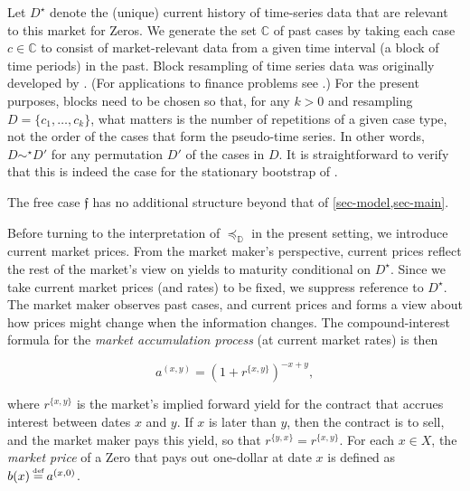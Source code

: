 \documentclass[12pt,a4paper,twoside]{article}
\newcommand{\novel}{\mathfrak f}
\newcommand{\mbbd}{{\mathds D}}
\newcommand{\mbbc}{{\mathds C}}
\newcommand{\past}{{D^\star}}
\newcommand{\xy}{{(x, y)}}
\begin{document}
Let $\past$ denote the (unique) current history of time-series data that are
relevant to this market for Zeros.  We generate the set $\mbbc$ of past cases
by taking each case $c \in \mbbc$ to consist of market-relevant data from a
given time interval (a block of time periods) in the past. Block resampling of
time series data was originally developed by
\citet{kunsch1989jackknife,politis1994stationary}. (For applications to
finance problems see \citet{white2000reality,harvey2021lucky}.) For the
present purposes, blocks need to be chosen so that, for any $k > 0$ and
resampling $D = \{c_1, \dots, c_k\}$, what matters is the number of repetitions
of a given case type, not the order of the cases that form the pseudo-time
series. In other words, $D \sim^\star D'$ for any permutation $D'$ of the cases
in $D$.  It is straightforward to verify that this is indeed the case for the
stationary bootstrap of \citet[section 2]{politis1994stationary}.

The free case $\novel$ has no additional structure beyond that of
\cref{sec-model,sec-main}.

Before turning to the interpretation of $\preceq_\mbbd$ in the present setting,
we introduce current market prices. From the market maker's perspective,
current prices reflect the rest of the market's view on yields to maturity
conditional on $\past$. Since we take current market prices (and rates) to be
fixed, we suppress reference to $\past$. The market maker observes past cases,
and current prices and forms a view about how prices might change when the
information changes.  The compound-interest formula for the \emph{market
accumulation process} (at current market rates) is then
\begin{linenomath*}
  \begin{equation*}a^{\xy} = \left(1+r^{\{x,y\}}\right)^{-x + y},
  \end{equation*}
\end{linenomath*}
where $r^{\{x,y\}}$ is the market's implied forward yield for the contract that
accrues interest between dates $x$ and $y$. If $x$ is later than $y$, then the
contract is to sell, and the market maker pays this yield, so that $r^{\{y,x\}}
= r^{\{x,y\}}$. For each $x \in X$, the \emph{market price} of a Zero that pays
out one-dollar at date $x$ is defined as $b(x) \defeq a^{(x, 0)}$.
\end{document}
